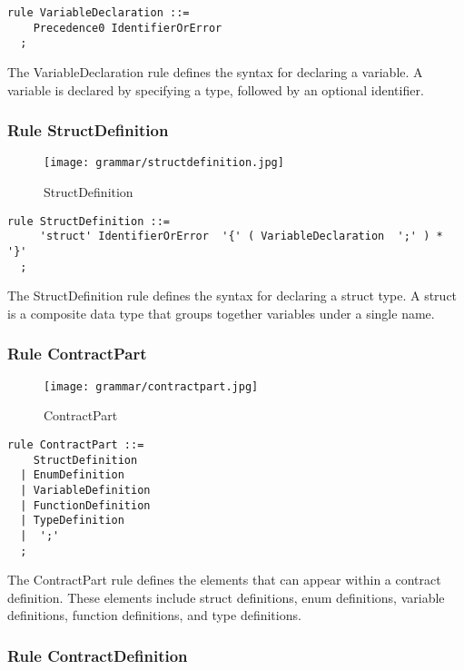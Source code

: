\begin{lstlisting}
rule VariableDeclaration ::=
    Precedence0 IdentifierOrError 
  ;
\end{lstlisting}

The VariableDeclaration rule defines the syntax for declaring a variable. A variable is declared by specifying a type, followed by an optional identifier.

\subsubsection*{Rule StructDefinition}

\begin{figure}[!ht]
\centering
\texttt{[image: grammar/structdefinition.jpg]}
\caption{StructDefinition}
\end{figure}

\begin{lstlisting}
rule StructDefinition ::=
     'struct' IdentifierOrError  '{' ( VariableDeclaration  ';' ) *   '}' 
  ;
\end{lstlisting}

The StructDefinition rule defines the syntax for declaring a struct type. A struct is a composite data type that groups together variables under a single name.

\subsubsection*{Rule ContractPart}

\begin{figure}[!ht]
\centering
\texttt{[image: grammar/contractpart.jpg]}
\caption{ContractPart}
\end{figure}

\begin{lstlisting}
rule ContractPart ::=
    StructDefinition 
  | EnumDefinition 
  | VariableDefinition 
  | FunctionDefinition 
  | TypeDefinition 
  |  ';' 
  ;
\end{lstlisting}

The ContractPart rule defines the elements that can appear within a contract definition. These elements include struct definitions, enum definitions, variable definitions, function definitions, and type definitions.

\subsubsection*{Rule ContractDefinition}

